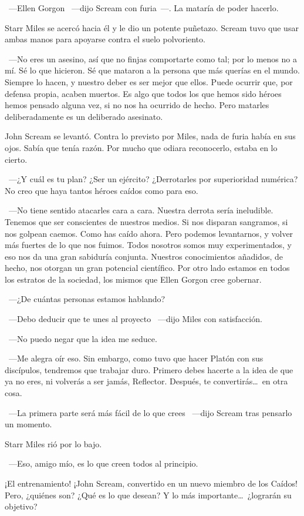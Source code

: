 ~---Ellen Gorgon ~---dijo Scream con furia~---. La mataría de poder hacerlo.

Starr Miles se acercó hacia él y le dio un potente puñetazo. Scream tuvo que usar ambas manos para apoyarse contra el suelo polvoriento.

~---No eres un asesino, así que no finjas comportarte como tal; por lo menos no a mí. Sé lo que hicieron. Sé que mataron a la persona que más querías en el mundo. Siempre lo hacen, y nuestro deber es ser mejor que ellos. Puede ocurrir que, por defensa propia, acaben muertos. Es algo que todos los que hemos sido héroes hemos pensado alguna vez, si no nos ha ocurrido de hecho. Pero matarles deliberadamente es un deliberado asesinato.

John Scream se levantó. Contra lo previsto por Miles, nada de furia había en sus ojos. Sabía que tenía razón. Por mucho que odiara reconocerlo, estaba en lo cierto.

~---¿Y cuál es tu plan? ¿Ser un ejército? ¿Derrotarles por superioridad numérica? No creo que haya tantos héroes caídos como para eso.

~---No tiene sentido atacarles cara a cara. Nuestra derrota sería ineludible. Tenemos que ser conscientes de nuestros medios. Si nos disparan sangramos, si nos golpean caemos. Como has caído ahora. Pero podemos levantarnos, y volver más fuertes de lo que nos fuimos. Todos nosotros somos muy experimentados, y eso nos da una gran sabiduría conjunta. Nuestros conocimientos añadidos, de hecho, nos otorgan un gran potencial científico. Por otro lado estamos en todos los estratos de la sociedad, los mismos que Ellen Gorgon cree gobernar.

~---¿De cuántas personas estamos hablando?

~---Debo deducir que te unes al proyecto ~---dijo Miles con satisfacción.

~---No puedo negar que la idea me seduce.

~---Me alegra oír eso. Sin embargo, como tuvo que hacer Platón con sus discípulos, tendremos que trabajar duro. Primero debes hacerte a la idea de que ya no eres, ni volverás a ser jamás, Reflector. Después, te convertirás\dots\ en otra cosa.

~---La primera parte será más fácil de lo que crees ~---dijo Scream tras pensarlo un momento.

Starr Miles rió por lo bajo.

~---Eso, amigo mío, es lo que creen todos al principio.

\begin{next}
    ¡El entrenamiento! ¡John Scream, convertido en un nuevo miembro de los Caídos! Pero, ¿quiénes son? ¿Qué es lo que desean? Y lo más importante\dots\ ¿lograrán su objetivo?
\end{next}

\endinput
